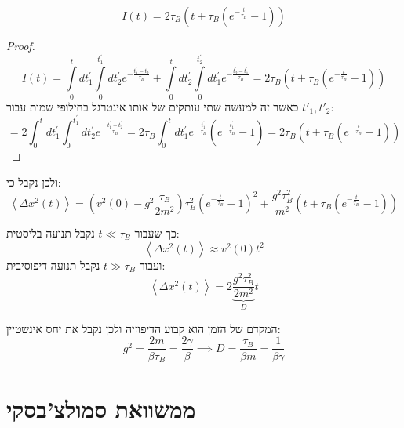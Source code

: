 \documentclass{tstextbook}
\begin{document}
\begin{lemma}
$$I(t)=2\tau_{B}\left(t+\tau_{B}\left(e^{-{\frac{t}{\tau_{B}}}}-1\right)\right)$$

\end{lemma}
\begin{proof}
$$I\left(t\right)=\int\limits_{0}^{t}{d t_{1}^{\prime}}\int\limits_{0}^{t_{1}^{\prime}}{d t_{2}^{\prime}}e^{-\frac{t_{1}^{\prime}-t_{2}^{\prime}}{\tau_{B}}}+\int\limits_{0}^{t}{d t_{2}^{\prime}}\int\limits_{0}^{t_{2}^{\prime}}{d t_{1}^{\prime}}e^{-\frac{t_{2}^{\prime}-t_{1}^{\prime}}{\tau_{B}}}=2\tau_{B}\left(t+\tau_{B}\left(e^{-{\frac{t}{\tau_{B}}}}-1\right)\right)$$
כאשר זה למעשה שתי עותקים של אותו אינטרגל בחילופי שמות עבור \(t'_{1},t'_{2}\):
$$=2\int_{0}^{t}d t_{1}^{\prime}\int_{0}^{t_{1}^{\prime}}d t_{2}^{\prime}e^{-\frac{t_{1}^{\prime}-t_{2}^{\prime}}{\tau_{B}}}=2\tau_{B}\int_{0}^{t}d t_{1}^{\prime}e^{-\frac{t_{1}^{\prime}}{\tau_{B}}}\left(e^{-\frac{t_{1}^{\prime}}{\tau_{B}}}-1\right)=2\tau_{B}\left(t+\tau_{B}\left(e^{-{\frac{t}{\tau_{B}}}}-1\right)\right)$$

\end{proof}
ולכן נקבל כי:
$$\left\langle\Delta x^{2}\left(t\right)\right\rangle=\left(v^{2}\left(0\right)-g^{2}\frac{\tau_{B}}{2m^{2}}\right)\tau_{B}^{2}\left(e^{-\frac{t}{\tau_{B}}}-1\right)^{2}+\frac{g^{2}\tau_{B}^{2}}{m^{2}}\left(t+\tau_{B}\left(e^{-\frac{t}{\tau_{B}}}-1\right)\right)$$

כך שעבור \(t\ll \tau_{B}\) נקבל תנועה בליסטית:
$$\left\langle\Delta x^{2}\left(t\right)\right\rangle\approx v^{2}\left(0\right)t^{2}$$
ועבור \(t\gg \tau_{B}\) נקבל תנועה דיפוסיבית:
$$\left\langle\Delta x^{2}\left(t\right)\right\rangle=2\underbrace{\frac{g^{2}\tau_{B}^{2}}{2m^{2}}}_{D}t$$

המקדם של הזמן הוא קבוע הדיפוזיה ולכן נקבל את יחס אינשטיין:
$$g^{2}=\frac{2m}{\beta\tau_{B}}=\frac{2\gamma}{\beta}\implies D=\frac{\tau_{B}}{\beta m}=\frac{1}{\beta\gamma}$$

\section{ממשוואת סמולצ'בסקי}
\end{document}
